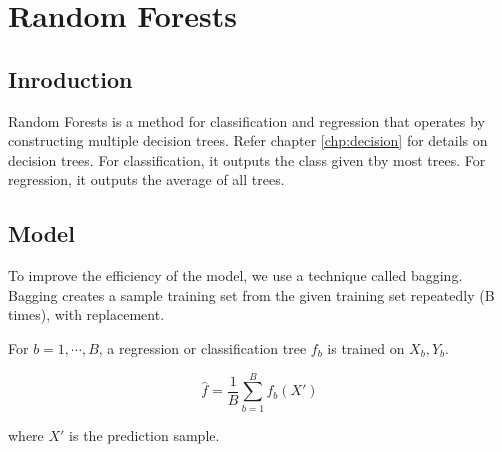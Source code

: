 \chapter{Random Forests}
\label{chp:forests}

\section{Inroduction}
Random Forests is a method for classification and regression that operates by
constructing multiple decision trees. Refer chapter \ref{chp:decision} for details
on decision trees. For classification, it outputs the class given tby  most trees.
For regression, it outputs the average of all trees.

\section{Model}
To improve the efficiency of the model, we use a technique called bagging.
Bagging creates a sample training set from the given training set repeatedly
(B times),
with replacement.

For $b=1,\cdots , B$, a regression or classification tree $f_b$ is trained on $X_b,Y_b$.

\begin{equation}
    \hat{f} = \frac{1}{B} \sum_{b=1}^{B} f_b(X')
\end{equation}

where $X'$ is the prediction sample.